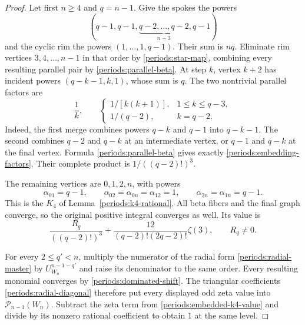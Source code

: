\begin{proof}
Let first $n\ge4$ and $q=n-1$.  Give the spokes the powers
\begin{equation}
 (q-1,q-1,\underbrace{q-2,\ldots,q-2}_{n-3},q-1)
 \label{periods:embedded-spokes}
\end{equation}
and the cyclic rim the powers $(1,\ldots,1,q-1)$.  Their sum is $nq$.
Eliminate rim vertices $3,4,\ldots,n-1$ in that order by
\eqref{periods:star-map}, combining every resulting parallel pair by
\eqref{periods:parallel-beta}.  At step $k$, vertex $k+2$ has incident
powers $(q-k-1,k,1)$, whose sum is $q$.  The two nontrivial parallel
factors are
\begin{equation}
 \frac1k,\qquad
 \begin{cases}
 1/[k(k+1)],&1\le k\le q-3,\\
 1/(q-2),&k=q-2.
 \end{cases}
 \label{periods:embedding-factors}
\end{equation}
Indeed, the first merge combines powers $q-k$ and $q-1$ into
$q-k-1$.  The second combines $q-2$ and $q-k$ at an intermediate
vertex, or $q-1$ and $q-k$ at the final vertex.  Formula
\eqref{periods:parallel-beta} gives exactly
\eqref{periods:embedding-factors}.  Their complete product is
$1/((q-2)!)^3$.

The remaining vertices are $0,1,2,n$, with powers
\begin{equation}
 \alpha_{01}=q-1,\qquad
 \alpha_{02}=\alpha_{0n}=\alpha_{12}=1,\qquad
 \alpha_{2n}=\alpha_{1n}=q-1.
 \label{periods:final-k4}
\end{equation}
This is the $K_4$ of Lemma~\ref{periods:k4-rational}.  All beta fibers
and the final graph converge, so the original positive integral
converges as well.  Its value is
\begin{equation}
 \frac{R_q}{((q-2)!)^3}
 +\frac{12}{(q-2)!(2q-2)!}\zeta(3),
 \qquad R_q\ne0.
 \label{periods:embedded-k4-value}
\end{equation}

For every $2\le q'<n$, multiply the numerator of the radial form
\eqref{periods:radial-master} by $U_{W_n}^{n-1-q'}$ and raise its
denominator to the same order.  Every resulting monomial converges by
\eqref{periods:dominated-shift}.  The triangular coefficients
\eqref{periods:radial-diagonal} therefore put every displayed odd zeta
value into $\mathcal P_{n-1}(W_n)$.  Subtract the zeta term from
\eqref{periods:embedded-k4-value} and divide by its nonzero rational
coefficient to obtain $1$ at the same level.


\end{proof}
